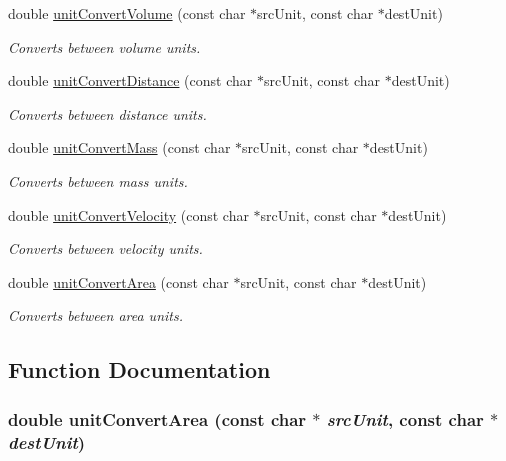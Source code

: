 \begin{CompactItemize}
double \hyperlink{group__unit__conv_g83e38e7be9d19563a1c4abae17158e3e}{unitConvertVolume} (const char $\ast$srcUnit, const char $\ast$destUnit)
\begin{CompactList}\small\item\em Converts between volume units. \item\end{CompactList}\item 
double \hyperlink{group__unit__conv_g8fe6b1304fb3c8d0d21d62178367df0f}{unitConvertDistance} (const char $\ast$srcUnit, const char $\ast$destUnit)
\begin{CompactList}\small\item\em Converts between distance units. \item\end{CompactList}\item 
double \hyperlink{group__unit__conv_g3fad4536c3e0108ca36dd54208bfa029}{unitConvertMass} (const char $\ast$srcUnit, const char $\ast$destUnit)
\begin{CompactList}\small\item\em Converts between mass units. \item\end{CompactList}\item 
double \hyperlink{group__unit__conv_g444606c1ce32b9818c42657b817895e0}{unitConvertVelocity} (const char $\ast$srcUnit, const char $\ast$destUnit)
\begin{CompactList}\small\item\em Converts between velocity units. \item\end{CompactList}\item 
double \hyperlink{group__unit__conv_g2b1c6e35197223f25aef246277f92ac0}{unitConvertArea} (const char $\ast$srcUnit, const char $\ast$destUnit)
\begin{CompactList}\small\item\em Converts between area units. \item\end{CompactList}\end{CompactItemize}


\subsection{Function Documentation}
\hypertarget{group__unit__conv_g2b1c6e35197223f25aef246277f92ac0}{
\subsubsection[unitConvertArea]{\setlength{\rightskip}{0pt plus 5cm}double unitConvertArea (const char $\ast$ {\em srcUnit}, \/  const char $\ast$ {\em destUnit})}}
\label{group__unit__conv_g2b1c6e35197223f25aef246277f92ac0}


